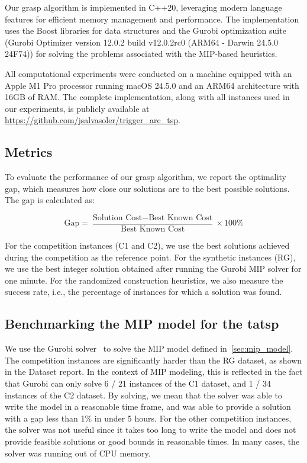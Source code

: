 \documentclass[twocolumn, switch]{article} %
\begin{document}
Our \gls{grasp} algorithm is implemented in C++20, leveraging modern language features for efficient memory management and performance.
The implementation uses the Boost libraries for data structures and the Gurobi optimization suite (Gurobi Optimizer version 12.0.2 build v12.0.2rc0 (ARM64 - Darwin 24.5.0 24F74)) for solving the problems associated with the MIP-based heuristics.

All computational experiments were conducted on a machine equipped with an Apple M1 Pro processor running macOS 24.5.0 and an ARM64 architecture with 16GB of RAM.
The complete implementation, along with all instances used in our experiments, is publicly available at \url{https://github.com/jsalvasoler/trigger_arc_tsp}.

\subsection{Metrics}

To evaluate the performance of our \gls{grasp} algorithm, we report the optimality gap, which measures how close our solutions are to the best possible solutions. The gap is calculated as:

\begin{equation}
\text{Gap} = \frac{\text{Solution Cost} - \text{Best Known Cost}}{\text{Best Known Cost}} \times 100\%
\end{equation}

For the competition instances (C1 and C2), we use the best solutions achieved during the competition as the reference point.
For the synthetic instances (RG), we use the best integer solution obtained after running the Gurobi MIP solver for one minute.
For the randomized construction heuristics, we also measure the success rate, i.e., the percentage of instances for which a solution was found.

\subsection{Benchmarking the MIP model for the \gls{tatsp}}

We use the Gurobi solver~\cite{gurobi} to solve the MIP model defined in~\ref{sec:mip_model}.
The competition instances are significantly harder than the RG dataset, as shown in the Dataset report. In the context of MIP modeling, this is reflected in the fact
that Gurobi can only solve 6 / 21 instances of the C1 dataset, and 1 / 34 instances of the C2 dataset.
By solving, we mean that the solver was able to write the model in a reasonable time frame, and was able to provide a solution with a gap less than 1\% in under 5 hours.
For the other competition instances, the solver was not useful since it takes too long to write the model and does not provide feasible solutions or good bounds in reasonable times.
In many cases, the solver was running out of CPU memory.
\end{document}

